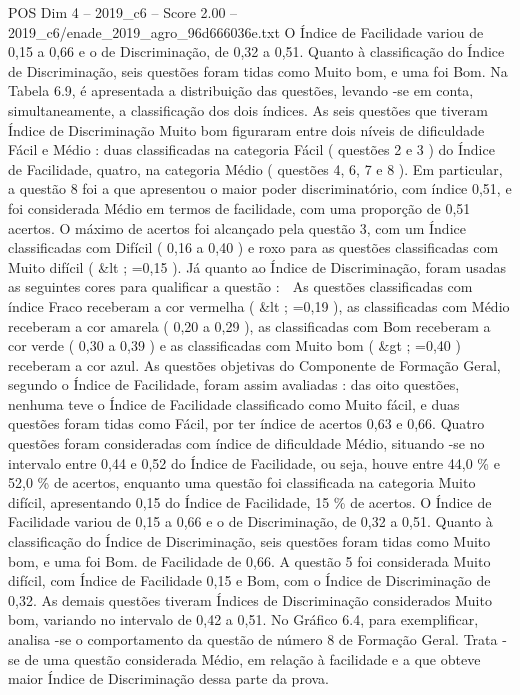 \begin{textsample}{POS Dim 4 – 2019\_c6 – Score 2.00 – 2019\_c6/enade\_2019\_agro\_96d666036e.txt}
O Índice de Facilidade variou de 0,15 a 0,66 e o de Discriminação, de 0,32 a 0,51.
Quanto à classificação do Índice de Discriminação, seis questões foram tidas como Muito bom, e uma foi Bom.
Na Tabela 6.9, é apresentada a distribuição das questões, levando -se em conta, simultaneamente, a classificação dos dois índices.
As seis questões que tiveram Índice de Discriminação Muito bom figuraram entre dois níveis de dificuldade Fácil e Médio : duas classificadas na categoria Fácil ( questões 2 e 3 ) do Índice de Facilidade, quatro, na categoria Médio ( questões 4, 6, 7 e 8 ).
Em particular, a questão 8 foi a que apresentou o maior poder discriminatório, com índice 0,51, e foi considerada Médio em termos de facilidade, com uma proporção de 0,51 acertos.
O máximo de acertos foi alcançado pela questão 3, com um Índice classificadas com Difícil ( 0,16 a 0,40 ) e roxo para as questões classificadas com Muito difícil ( \&lt ; =0,15 ).
Já quanto ao Índice de Discriminação, foram usadas as seguintes cores para qualificar a questão :  As questões classificadas com índice Fraco receberam a cor vermelha ( \&lt ; =0,19 ), as classificadas com Médio receberam a cor amarela ( 0,20 a 0,29 ), as classificadas com Bom receberam a cor verde ( 0,30 a 0,39 ) e as classificadas com Muito bom ( \&gt ; =0,40 ) receberam a cor azul.
As questões objetivas do Componente de Formação Geral, segundo o Índice de Facilidade, foram assim avaliadas : das oito questões, nenhuma teve o Índice de Facilidade classificado como Muito fácil, e duas questões foram tidas como Fácil, por ter índice de acertos 0,63 e 0,66.
Quatro questões foram consideradas com índice de dificuldade Médio, situando -se no intervalo entre 0,44 e 0,52 do Índice de Facilidade, ou seja, houve entre 44,0 \% e 52,0 \% de acertos, enquanto uma questão foi classificada na categoria Muito difícil, apresentando 0,15 do Índice de Facilidade, 15 \% de acertos.
O Índice de Facilidade variou de 0,15 a 0,66 e o de Discriminação, de 0,32 a 0,51.
Quanto à classificação do Índice de Discriminação, seis questões foram tidas como Muito bom, e uma foi Bom. de Facilidade de 0,66.
A questão 5 foi considerada Muito difícil, com Índice de Facilidade 0,15 e Bom, com o Índice de Discriminação de 0,32.
As demais questões tiveram Índices de Discriminação considerados Muito bom, variando no intervalo de 0,42 a 0,51.
No Gráfico 6.4, para exemplificar, analisa -se o comportamento da questão de número 8 de Formação Geral.
Trata -se de uma questão considerada Médio, em relação à facilidade e a que obteve maior Índice de Discriminação dessa parte da prova.

\end{textsample}
